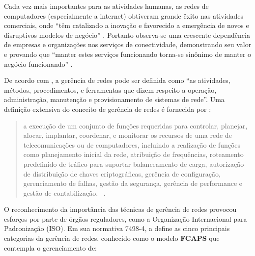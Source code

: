 \documentclass[twoside,english,brazilian]{UNISINOSmonografia}
\begin{document}
Cada vez mais importantes para as atividades humanas, as redes de computadores 
(especialmente a internet) obtiveram grande êxito nas atividades comerciais, 
onde ``têm catalizado a inovação e favorecido a emergência de novos e 
disruptivos modelos de negócio'' \cite{Ding2009}.
Portanto observa-se uma crescente dependência de empresas e organizações nos 
serviços de conectividade, demonstrando seu valor e provando que ``manter 
estes serviços funcionando torna-se sinônimo de manter o negócio funcionando''
\cite{Clemm2006}.


	
	De acordo com , a gerência de redes pode ser definida 
	como ``as atividades, métodos, procedimentos, e ferramentas que dizem 
	respeito a operação, administração, manutenção e provisionamento de 
	sistemas de rede''. Uma definição extensiva do conceito de gerência de 
	redes é fornecida por :
	
	\begin{quote}
		a execução de um conjunto de funções requeridas para controlar, 
		planejar, alocar, implantar, coordenar, e monitorar os recursos de uma 
		rede de telecomunicações ou de computadores, incluindo a realização de 
		funções como planejamento inicial da rede, atribuição de frequências, 
		roteamento predefinido de tráfico para suportar balanceamento de 
		carga, autorização de distribuição de chaves criptográficas, gerência 
		de configuração, gerenciamento de falhas, gestão da segurança, 
		gerência de performance e gestão de contabilização.~
		\cite[p.~64]{Ding2009}.
	\end{quote}
	
	O reconhecimento da importância das técnicas de gerência de redes provocou 
	esforços por parte de órgãos reguladores, como a Organização Internacional 
	para Padronização (ISO). Em sua normativa 7498-4, a  
	define as cinco principais categorias da gerência de redes, conhecido como 
	o modelo \textbf{FCAPS} que contempla o gerenciamento de:
	
\end{document}
